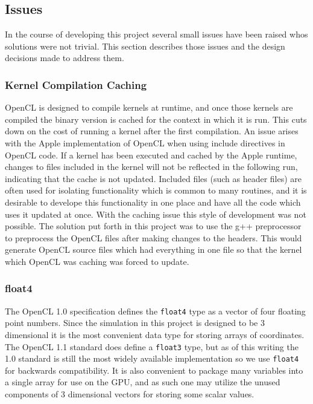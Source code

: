 \subsection{Issues}
In the course of developing this project several small issues have been raised
whos solutions were not trivial. This section describes those issues and the
design decisions made to address them.

\subsubsection{Kernel Compilation Caching}
OpenCL is designed to compile kernels at runtime, and once those kernels are
compiled the binary version is cached for the context in which it is run. This
cuts down on the cost of running a kernel after the first compilation. An issue
arises with the Apple implementation of OpenCL when using include directives in
OpenCL code. If a kernel has been executed and cached by the Apple runtime,
changes to files included in the kernel will not be reflected in the following
run, indicating that the cache is not updated. Included files (such as header
files) are often used for isolating functionality which is common to many
routines, and it is desirable to develope this functionality in one place and
have all the code which uses it updated at once. With the caching issue this
style of development was not possible. The solution put forth in this project
was to use the g++ preprocessor to preprocess the OpenCL files after making
changes to the headers. This would generate OpenCL source files which had
everything in one file so that the kernel which OpenCL was caching was forced
to update. 


\subsubsection{float4}
The OpenCL 1.0 specification defines the \verb|float4| type as a vector of four
floating point numbers. Since the simulation in this project is designed to be
3 dimensional it is the most convenient data type for storing arrays of
coordinates. The OpenCL 1.1 standard does define a \verb|float3| type, but as
of this writing the 1.0 standard is still the most widely available
implementation so we use \verb|float4| for backwards compatibility. It is also
convenient to package many variables into a single array for use on the GPU,
and as such one may utilize the unused components of 3 dimensional vectors for
storing some scalar values.

